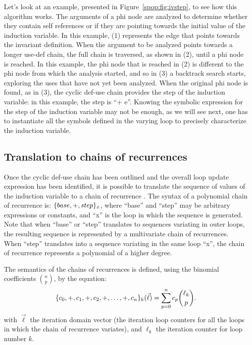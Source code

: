Let's look at an example, presented in Figure~\ref{spop:fig:ivstep},
to see how this algorithm works.  The arguments of a phi node are
analyzed to determine whether they contain self references or if they
are pointing towards the initial value of the induction variable.  In
this example, (1) represents the edge that points towards the
invariant definition.  When the argument to be analyzed points towards
a longer use-def chain, the full chain is traversed, as shown in (2),
until a phi node is reached.  In this example, the phi node that is
reached in (2) is different to the phi node from which the analysis
started, and so in (3) a backtrack search starts, exploring the uses
that have not yet been analyzed.  When the original phi node is found,
as in (3), the cyclic def-use chain provides the step of the induction
variable: in this example, the step is ``+ e''.  Knowing the symbolic
expression for the step of the induction variable may not be enough,
as we will see next, one has to instantiate all the symbols defined in
the varying loop to precisely characterize the induction variable.

\subsection{Translation to chains of recurrences}

Once the cyclic def-use chain has been outlined and the overall loop
update expression has been identified, it is possible to translate the
sequence of values of the induction variable to a chain of recurrence
\cite{BWZ94,KMZ98,Zim01}.  The syntax of a polynomial chain of
recurrence is: $\{base, +, step\}_x$, where ``base'' and ``step''
may be arbitrary expressions or constants, and ``x'' is the loop in
which the sequence is generated.  Note that when ``base'' or ``step''
translates to sequences variating in outer loops, the resulting
sequence is represented by a multivariate chain of recurrences.  When
``step'' translates into a sequence variating in the same loop ``x'',
the chain of recurrence represents a polynomial of a higher degree.

The semantics of the chains of recurrences is defined, using the
binomial coefficients $\binom{n}{p}$, by the equation:
\begin{equation*}
  \{c_0,+,c_1,+,c_2,+,\ldots,+,c_n\}_k(\vec{\ell})=
  \sum_{p=0}^{n}c_{p}\binom{\ell_k}{p}.
\end{equation*}
with $\vec{\ell}$ the iteration domain vector (the iteration loop
counters for all the loops in which the chain of recurrence variates),
and $\ell_k$ the iteration counter for loop number $k$.

